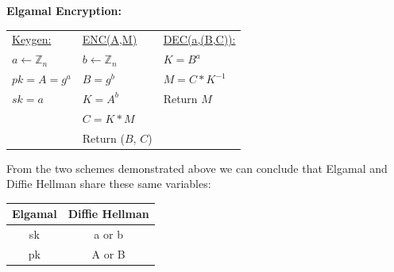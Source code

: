 \documentclass[letterpaper,11pt,notitlepage,fleqn]{article}
\begin{document}
\noindent \textbf{Elgamal Encryption:} \\
\begin{center}
\begin{tabular}{|l l l|}
    \hline
    \underline{Keygen:} & \underline{ENC(A,M)} & \underline{DEC(a,(B,C)):} \\ 
    $a \leftarrow \mathbb{Z}_{n}$ & $b \leftarrow \mathbb{Z}_{n}$ & $K = B^a$ \\
    $pk = A = g^a$ & $B = g^b$ & $M = C \ast K^{-1}$ \\
    $sk = a$ & $K = A^b$ & Return $M$ \\
    & $C = K \ast M$ & \\
    & Return ($B$, $C$) & \\
    \hline
    
\end{tabular}
\end{center}
From the two schemes demonstrated above we can conclude that Elgamal and Diffie Hellman share these same variables:
\begin{center}
    \begin{tabular} {|c|c|}
        \hline
        \textbf{Elgamal} & \textbf{Diffie Hellman} \\
        \hline
        sk & a or b \\
        \hline
        pk & A or B \\
        \hline
    \end{tabular}
\end{center}
\end{document}
